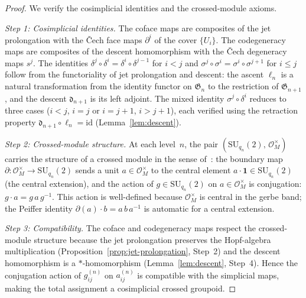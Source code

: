 \begin{proof}
We verify the cosimplicial identities and the crossed-module axioms.

\emph{Step 1: Cosimplicial identities.}\;
The coface maps are composites of the jet prolongation with the
\v{C}ech face maps $\partial^i$ of the cover $\{U_i\}$.  The
codegeneracy maps are composites of the descent homomorphism with the
\v{C}ech degeneracy maps $s^j$.  The identities
$\delta^j \circ \delta^i = \delta^i \circ \delta^{j-1}$ for $i < j$
and $\sigma^j \circ \sigma^i = \sigma^i \circ \sigma^{j+1}$ for $i \leq j$
follow from the functoriality of jet prolongation and descent: the ascent
$\ell_n$ is a natural transformation from the identity functor on
$\mathfrak{G}_n$ to the restriction of $\mathfrak{G}_{n+1}$, and the
descent $\mathfrak{d}_{n+1}$ is its left adjoint.  The mixed identity
$\sigma^j \circ \delta^i$ reduces to three cases
($i < j$, $i = j$ or $i = j + 1$, $i > j + 1$), each verified using
the retraction property $\mathfrak{d}_{n+1} \circ \ell_n = \mathrm{id}$
(Lemma~\ref{lem:descent}).

\emph{Step 2: Crossed-module structure.}\;
At each level~$n$, the pair
$(\mathrm{SU}_{q_n}(2),\, \mathcal{O}_M^{\times})$ carries the structure
of a crossed module in the sense of~\cite{yekutieli2010}: the boundary
map $\partial \colon \mathcal{O}_M^{\times} \to \mathrm{SU}_{q_n}(2)$
sends a unit $a \in \mathcal{O}_M^{\times}$ to the central element
$a \cdot \mathbf{1} \in \mathrm{SU}_{q_n}(2)$ (the central extension),
and the action of $g \in \mathrm{SU}_{q_n}(2)$ on
$a \in \mathcal{O}_M^{\times}$ is conjugation:
$g \cdot a = g\, a\, g^{-1}$.  This action is well-defined because
$\mathcal{O}_M^{\times}$ is central in the gerbe band; the Peiffer
identity $\partial(a) \cdot b = a\, b\, a^{-1}$ is automatic for a
central extension.

\emph{Step 3: Compatibility.}\;
The coface and codegeneracy maps respect the crossed-module structure
because the jet prolongation preserves the Hopf-algebra multiplication
(Proposition~\ref{prop:jet-prolongation}, Step~2) and the descent
homomorphism is a $*$-homomorphism (Lemma~\ref{lem:descent}, Step~4).
Hence the conjugation action of $g_{ij}^{(n)}$ on $a_{ij}^{(n)}$ is
compatible with the simplicial maps, making the total assignment a
cosimplicial crossed groupoid.
\end{proof}

